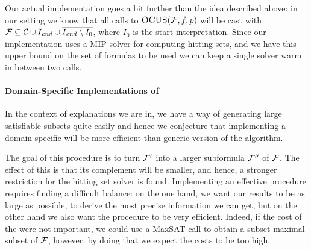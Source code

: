 Our actual implementation goes a bit further than the idea described above: in our setting we know that all calls to $\textsc{OCUS}(\mathcal{F} ,f,p)$ will be cast with $\mathcal{F}  \subseteq \mathcal{C}\cup I_\mathit{end}  \cup \overline{I_\mathit{end}  \setminus I_0}$, where $I_0$ is the start interpretation. Since our implementation uses a MIP solver for computing hitting sets, and we have this upper bound on the set of formulas to be used we can keep a single solver warm in between two \comus calls. 




\paragraph{Domain-Specific Implementations of \grow} 
In the context of explanations we are in, we have a way of generating large satisfiable subsets quite easily and hence we conjecture that implementing a domain-specific \grow will be more efficient than generic version of the \grow algorithm. 

The goal of this \grow procedure is to turn $\mathcal{F} '$ into a larger subformula $\mathcal{F} ''$ of $\mathcal{F} $. The effect of this is that its complement will be smaller, and hence, a stronger restriction for the hitting set solver is found.  
Implementing an effective \grow procedure requires finding a difficult balance: on the one hand, we want our results to be as large as possible, to derive the most precise information we can get, but on the other hand we also want the procedure to be very efficient. 
Indeed, if the cost of the \grow were not important, we could use a MaxSAT call to obtain a subset-maximal subset of $\mathcal{F} $, however, by doing that we expect the \grow costs to be too high. 


